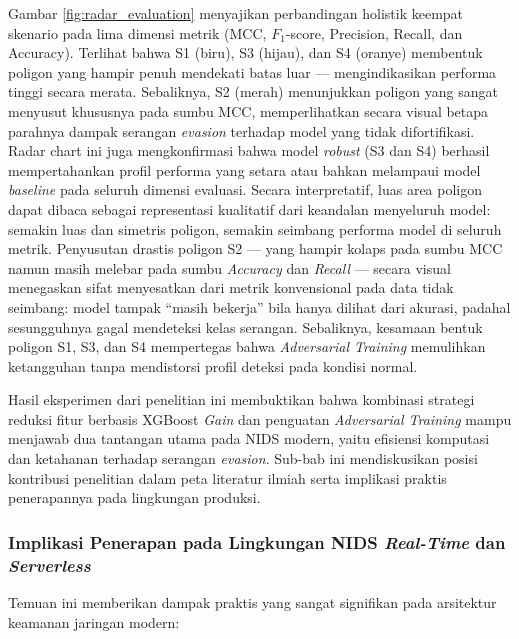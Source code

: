 \documentclass[11pt, a4paper]{article}
\begin{document}
Gambar \ref{fig:radar_evaluation} menyajikan perbandingan holistik keempat skenario pada lima dimensi metrik (MCC, $F_1$-score, Precision, Recall, dan Accuracy). Terlihat bahwa S1 (biru), S3 (hijau), dan S4 (oranye) membentuk poligon yang hampir penuh mendekati batas luar — mengindikasikan performa tinggi secara merata. Sebaliknya, S2 (merah) menunjukkan poligon yang sangat menyusut khususnya pada sumbu MCC, memperlihatkan secara visual betapa parahnya dampak serangan \textit{evasion} terhadap model yang tidak difortifikasi. Radar chart ini juga mengkonfirmasi bahwa model \textit{robust} (S3 dan S4) berhasil mempertahankan profil performa yang setara atau bahkan melampaui model \textit{baseline} pada seluruh dimensi evaluasi. Secara interpretatif, luas area poligon dapat dibaca sebagai representasi kualitatif dari keandalan menyeluruh model: semakin luas dan simetris poligon, semakin seimbang performa model di seluruh metrik. Penyusutan drastis poligon S2 --- yang hampir kolaps pada sumbu MCC namun masih melebar pada sumbu \textit{Accuracy} dan \textit{Recall} --- secara visual menegaskan sifat menyesatkan dari metrik konvensional pada data tidak seimbang: model tampak ``masih bekerja'' bila hanya dilihat dari akurasi, padahal sesungguhnya gagal mendeteksi kelas serangan. Sebaliknya, kesamaan bentuk poligon S1, S3, dan S4 mempertegas bahwa \textit{Adversarial Training} memulihkan ketangguhan tanpa mendistorsi profil deteksi pada kondisi normal.

Hasil eksperimen dari penelitian ini membuktikan bahwa kombinasi strategi reduksi fitur berbasis XGBoost \textit{Gain} dan penguatan \textit{Adversarial Training} mampu menjawab dua tantangan utama pada NIDS modern, yaitu efisiensi komputasi dan ketahanan terhadap serangan \textit{evasion}. Sub-bab ini mendiskusikan posisi kontribusi penelitian dalam peta literatur ilmiah serta implikasi praktis penerapannya pada lingkungan produksi.

\subsubsection{Implikasi Penerapan pada Lingkungan NIDS \textit{Real-Time} dan \textit{Serverless}}
Temuan ini memberikan dampak praktis yang sangat signifikan pada arsitektur keamanan jaringan modern:
\end{document}
